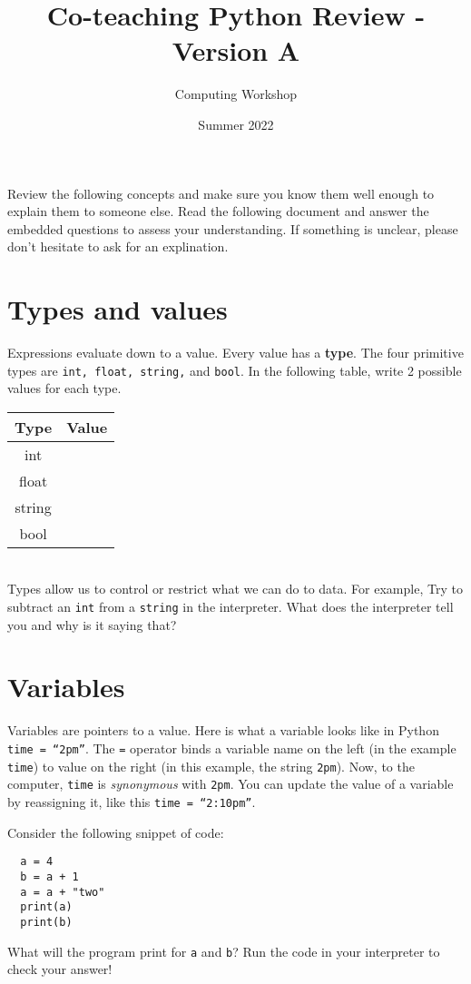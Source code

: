 \documentclass[11pt]{article}
\author{Computing Workshop}
\title{Co-teaching Python Review - Version A}
\date{Summer 2022}
\begin{document}
\maketitle

Review the following concepts and make sure you know them well enough to explain them to someone else. Read the
following document and answer the embedded questions to assess your understanding. If something is unclear, please don't hesitate to ask for an explination.

\section*{Types and values}

Expressions evaluate down to a value. Every value has a \textbf{type}. The four primitive types are \texttt{int, float, string,} and
\texttt{bool}. In the following table, write 2 possible values for each type.
\\

\def\arraystretch{2}
\begin{tabular}{| c | p{34em}|} \hline
  Type & Value \\ \hline
  int & ~ \\ \hline
  float & ~ \\ \hline
  string & ~ \\ \hline
  bool & ~ \\ \hline
\end{tabular}
\\

Types allow us to control or restrict what we can do to data. For example, Try to subtract an \texttt{int} from a
\texttt{string} in the interpreter. What does the interpreter tell you and why is it saying that?

\section*{Variables}

Variables are pointers to a value. Here is what a variable looks like in Python \texttt{time = ``2pm''}. The \texttt{=}
operator binds a variable name on the left (in the example \texttt{time}) to value on the right (in this example, the
string \texttt{2pm}). Now, to the computer, \texttt{time} is \emph{synonymous} with \texttt{2pm}. You can update the
value of a variable by reassigning it, like this \texttt{time = ``2:10pm''}.

Consider the following snippet of code:
\begin{lstlisting}
  a = 4
  b = a + 1
  a = a + "two"
  print(a)
  print(b)
\end{lstlisting}

What will the program print for \texttt{a} and \texttt{b}? Run the code in your interpreter to check your answer!
\end{document}
